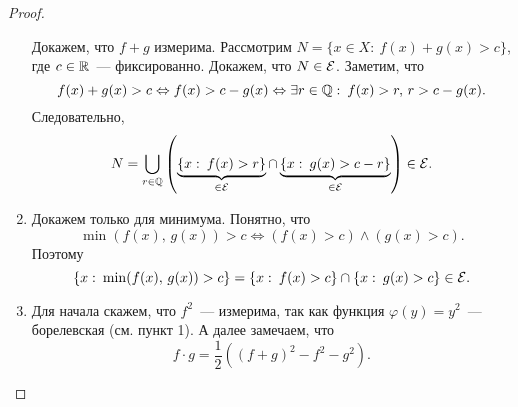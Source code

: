 \begin{claim}
\begin{proof}
\begin{enumerate}
                  Докажем, что $f+g$ измерима.
                  Рассмотрим $N = \{x\in X:\: f(x)+g(x)>c\}$, где $c\in\mathbb{R}$~--- фиксированно.
                  Докажем, что $N\in\mathcal{E}$.
                  Заметим, что
                  \[
                      f(x)+g(x)>c\Leftrightarrow f(x)>c-g(x)\Leftrightarrow\exists r\in\mathbb{Q}:\: f(x)>r,\, r > c-g(x).
                  \]
                  Следовательно, \[
                      N = \bigcup_{r\in\mathbb{Q}}\left(\underbrace{\{x:\: f(x)>r\}}_{\in\mathcal{E}}\cap\underbrace{\{x:\:g(x)>c-r\}}_{\in\mathcal{E}}\right)\in\mathcal{E}.
                  \]
            \item Докажем только для минимума. Понятно, что
                  \[
                      \min(f(x),\, g(x))>c\Leftrightarrow (f(x)>c)\wedge(g(x)>c).
                  \]
                  Поэтому \[
                      \{x:\:\min(f(x),\, g(x))>c\}=\{x:\:f(x)>c\}\cap \{x:\: g(x)>c\}\in\mathcal{E}.
                  \]
            \item Для начала скажем, что $f^2$~--- измерима, так как функция $\varphi(y)=y^2$~--- борелевская (см. пункт 1). А далее замечаем, что
                  \[
                      f\cdot g = \dfrac{1}{2}\left((f+g)^2-f^2-g^2\right).
                  \]
        \end{enumerate}

    \end{proof}
\end{claim}